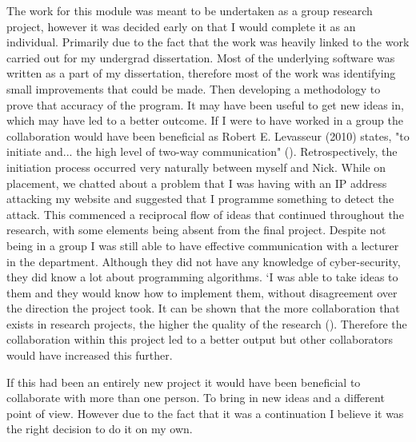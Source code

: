 The work for this module was meant to be undertaken as a group research project, however it was decided early on that I would complete it as an individual. Primarily due to the fact that the work was heavily linked to the work carried out for my undergrad dissertation. Most of the underlying software was written as a part of my dissertation, therefore most of the work was identifying small improvements that could be made. Then developing a methodology to prove that accuracy of the program. It may have been useful to get new ideas in, which may have led to a better outcome. If I were to have worked in a group the collaboration would have been beneficial as Robert E. Levasseur (2010) states, "to initiate and... the high level of two-way communication" (\cite{levasseur2010people}). Retrospectively, the initiation process occurred very naturally between myself and Nick. While on placement, we chatted about a problem that I was having with an IP address attacking my website and suggested that I programme something to detect the attack. This commenced a reciprocal flow of ideas that continued throughout the research, with some elements being absent from the final project. Despite not being in a group I was still able to have effective communication with a lecturer in the department. Although they did not have any knowledge of cyber-security, they did know a lot about programming algorithms. `I was able to take ideas to them and they would know how to implement them, without disagreement over the direction the project took. It can be shown that the more collaboration that exists in research projects, the higher the quality of the research (\cite{figg2006scientific}). Therefore the collaboration within this project led to a better output but other collaborators would have increased this further. 




If this had been an entirely new project it would have been beneficial to collaborate with more than one person. To bring in new ideas and a different point of view. However due to the fact that it was a continuation I believe it was the right decision to do it on my own.  